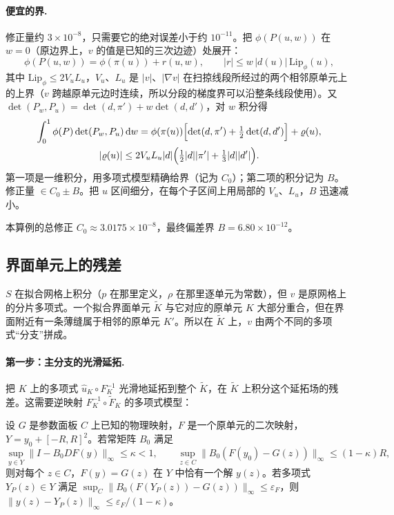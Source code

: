 \documentclass[11pt,a4paper,fontset=fandol]{ctexart}
\begin{document}
\paragraph{便宜的界.} 修正量约 $3\times10^{-8}$，只需要它的绝对误差小于约 $10^{-11}$。把 $\phi(P(u,w))$ 在 $w=0$（原边界上，$v$ 的值是已知的三次边迹）处展开：
\[
\phi(P(u,w))=\phi(\pi(u))+r(u,w),\qquad |r|\le w\,|d(u)|\,\mathrm{Lip}_\phi(u),
\]
其中 $\mathrm{Lip}_\phi\le2V_uL_u$，$V_u$、$L_u$ 是 $|v|$、$|\nabla v|$ 在扫掠线段所经过的两个相邻原单元上的上界（$v$ 跨越原单元边时连续，所以分段的梯度界可以沿整条线段使用）。又 $\det(P_w,P_u)=\det(d,\pi')+w\det(d,d')$，对 $w$ 积分得
\begin{gather*}
\int_0^1\phi(P)\det(P_w,P_u)\,\mathrm{d} w=\phi(\pi(u))\Bigl[\det(d,\pi')+\tfrac12\det(d,d')\Bigr]+\varrho(u),\\
|\varrho(u)|\le2V_uL_u|d|\Bigl(\tfrac12|d||\pi'|+\tfrac13|d||d'|\Bigr).
\end{gather*}
第一项是一维积分，用多项式模型精确给界（记为 $C_0$）；第二项的积分记为 $B$。修正量 $\in C_0\pm B$。把 $u$ 区间细分，在每个子区间上用局部的 $V_u$、$L_u$，$B$ 迅速减小。

本算例的总修正 $C_0\approx3.0175\times10^{-8}$，最终偏差界 $B=6.80\times10^{-12}$。

\subsection{界面单元上的残差}
\label{sec:interface}

$S$ 在拟合网格上积分（$p$ 在那里定义，$\rho$ 在那里逐单元为常数），但 $v$ 是原网格上的分片多项式。一个拟合界面单元 $\widetilde K$ 与它对应的原单元 $K$ 大部分重合，但在界面附近有一条薄缝属于相邻的原单元 $K'$。所以在 $\widetilde K$ 上，$v$ 由两个不同的多项式“分支”拼成。

\paragraph{第一步：主分支的光滑延拓.} 把 $K$ 上的多项式 $\widehat u_K\circ F_K^{-1}$ 光滑地延拓到整个 $\widetilde K$，在 $\widetilde K$ 上积分这个延拓场的残差。这需要逆映射 $F_K^{-1}\circ\widetilde F_K$ 的多项式模型：

\begin{lemma}[逆映射的模型]
\label{lem:inverse}
设 $G$ 是参数面板 $C$ 上已知的物理映射，$F$ 是一个原单元的二次映射，$Y=y_0+[-R,R]^2$。若常矩阵 $B_0$ 满足
\[
\sup_{y\in Y}\|I-B_0DF(y)\|_\infty\le\kappa<1,\qquad
\sup_{z\in C}\|B_0(F(y_0)-G(z))\|_\infty\le(1-\kappa)R ,
\]
则对每个 $z\in C$，$F(y)=G(z)$ 在 $Y$ 中恰有一个解 $y(z)$。若多项式 $Y_P(z)\in Y$ 满足 $\sup_C\|B_0(F(Y_P(z))-G(z))\|_\infty\le\varepsilon_F$，则 $\|y(z)-Y_P(z)\|_\infty\le\varepsilon_F/(1-\kappa)$。
\end{lemma}
\end{document}
